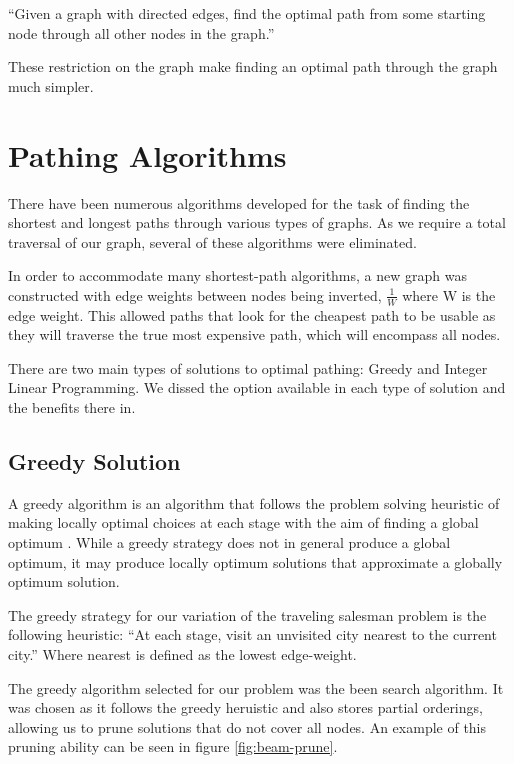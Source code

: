 \documentclass[bsc,frontabs,twoside,singlespacing,parskip,deptreport]{infthesis}     %
\begin{document}
\begin{center}
  \enquote{Given a graph with directed edges, find the optimal path from some starting node through all other nodes in
  the graph.}
\end{center}

These restriction on the graph make finding an optimal path through the graph much simpler.


\section{Pathing Algorithms}
There have been numerous algorithms developed for the task of finding the shortest and longest paths through various types of graphs.
As we require a total traversal of our graph, several of these algorithms were eliminated.

In order to accommodate many shortest-path algorithms, a new graph was constructed with edge weights between nodes being inverted,
$\frac{1}{W}$ where W is the edge weight. This allowed paths that look for the cheapest path to be usable as they will traverse the
true most expensive path, which will encompass all nodes.

There are two main types of solutions to optimal pathing: Greedy and Integer Linear Programming.
We dissed the option available in each type of solution and the benefits there in.

\subsection{Greedy Solution}
A greedy algorithm is an algorithm that follows the problem solving heuristic of making locally optimal choices at each stage with the aim
of finding a global optimum \cite{black2004dictionary}.
While a greedy strategy does not in general produce a global optimum, it may produce locally optimum solutions that approximate a globally optimum solution.


The greedy strategy for our variation of the traveling salesman problem is the following heuristic:
``At each stage, visit an unvisited city nearest to the current city.''
Where nearest is defined as the lowest edge-weight.


The greedy algorithm selected for our problem was the been search algorithm.
It was chosen as it follows the greedy heruistic and also stores partial orderings, allowing us to prune solutions that do not cover all nodes.
An example of this pruning ability can be seen in figure \ref{fig:beam-prune}.
\end{document}
